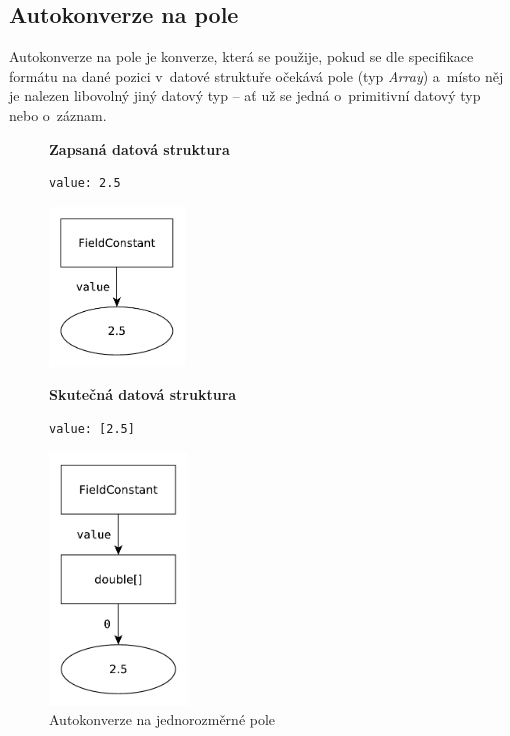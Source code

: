\documentclass[FM,bw,DP]{tulthesis}
\begin{document}
\subsection{Autokonverze na pole}

\lstset{style=short}

Autokonverze na pole je konverze, která se použije, pokud se dle specifikace formátu na dané pozici v~datové struktuře očekává pole (typ \textit{Array}) a~místo něj je nalezen libovolný jiný datový typ -- ať už se jedná o~primitivní datový typ nebo o~záznam.

\begin{figure}[ht]
\begin{minipage}[t]{0.45\linewidth}
\vspace{0pt}
\textbf{Zapsaná datová struktura}\\
\vspace{-5pt}
\begin{lstlisting}
value: 2.5
\end{lstlisting}
\vspace*{-20pt}
\begin{center}
\includegraphics[height=120pt]{../img/autoconversion_array_1_before.pdf}
\end{center}
\end{minipage}
\quad
\begin{minipage}[t]{0.45\linewidth}
\vspace{0pt}
\textbf{Skutečná datová struktura}\\
\vspace{-5pt}
\begin{lstlisting}
value: [2.5]
\end{lstlisting}
\vspace*{-20pt}
\begin{center}
\includegraphics[height=190pt]{../img/autoconversion_array_1_after.pdf}
\end{center}
\end{minipage}
\caption{Autokonverze na jednorozměrné pole}
\label{img:autoconversion_array_1}
\end{figure}	
\end{document}
